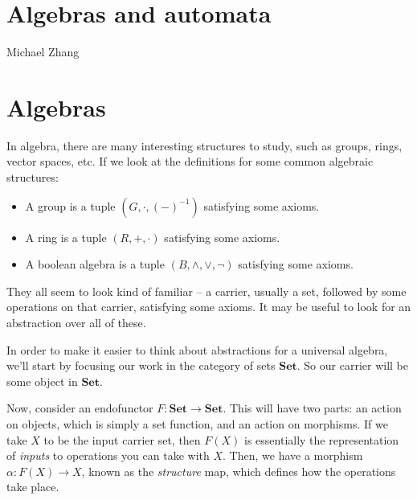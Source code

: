 \documentclass{article}
\theoremstyle{plain}
\theoremstyle{definition}
\begin{document}
 

 





 \section*{Algebras and automata}


Michael Zhang 

\section{Algebras}


 In algebra, there are many interesting structures to study, such as groups, rings, vector spaces, etc. If we look at the definitions for some common algebraic structures:

\begin{itemize}
\item A group is a tuple \ensuremath{\left( G, \cdot , {\left( - \right)}^{-1} \right)} satisfying some axioms.
\item A ring is a tuple \ensuremath{\left( R, +, \cdot \right)} satisfying some axioms.
\item A boolean algebra is a tuple \ensuremath{\left( B, \land , \lor , \neg \right)} satisfying some axioms.
\end{itemize}


They all seem to look kind of familiar -- a carrier, usually a set, followed by some operations on that carrier, satisfying some axioms. It may be useful to look for an abstraction over all of these.

In order to make it easier to think about abstractions for a universal algebra, we'll start by focusing our work in the category of sets \ensuremath{\mathbf{Set}}. So our carrier will be some object in \ensuremath{\mathbf{Set}}.

Now, consider an endofunctor \ensuremath{F : \mathbf{Set} \rightarrow \mathbf{Set}}. This will have two parts: an action on objects, which is simply a set function, and an action on morphisms. If we take \ensuremath{X} to be the input carrier set, then \ensuremath{F\left( X \right)} is essentially the representation of \emph{inputs} to operations you can take with \ensuremath{X}. Then, we have a morphism \ensuremath{\alpha : F\left( X \right) \rightarrow X}, known as the \emph{structure} map, which defines how the operations take place.
\end{document}
